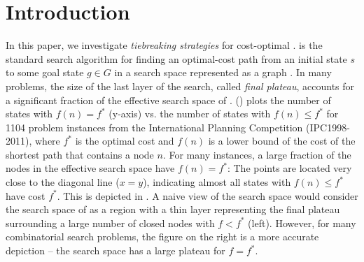 
\section{Introduction}
\label{sec:introduction}

In this paper, we investigate \emph{tiebreaking strategies} for cost-optimal \astar.
\astar is the standard search
algorithm for finding an optimal-cost path from an initial state $s$ to
some goal state $g \in G$ in a search space represented as a graph
\cite{hart1968formal}.
In many problems, the size of the last layer of the search, called
\emph{final plateau}, accounts for a significant fraction of the
effective search space of \astar.  
() plots the number of states with $f(n) = f^*$
(y-axis) vs. the number of states with $f(n) \leq f^*$ for 1104 problem
instances from the International Planning Competition (IPC1998-2011),
where $f^*$ is the optimal cost and $f(n)$ is a lower bound of the cost of the shortest path
that contains a node $n$.  For many instances, a large
fraction of the nodes in the effective search space have $f(n)=f^*$:
The points are located very close to the diagonal line
($x=y$), indicating almost all states with $f(n) \leq f^*$ have cost $f^*$.
This is depicted in . 
A naive view of the search space would consider the search space of \astar as a region with a thin layer representing the  final plateau surrounding a large number of closed nodes with $f<f^*$ (left).
However, for many combinatorial search problems, 
the figure on the right is a more accurate depiction -- the  search space has a large plateau 
for $f=f^*$.

